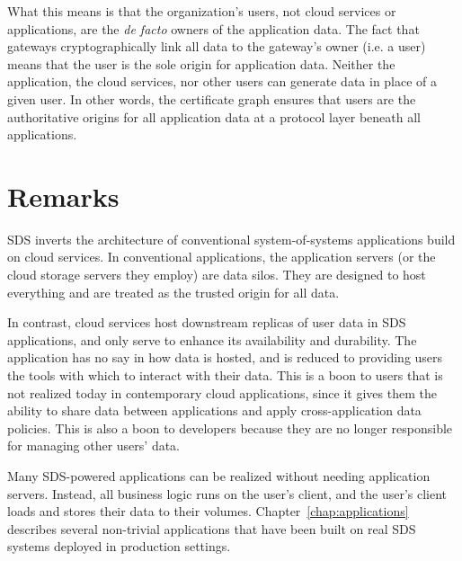 What this means is that the organization's users, not cloud services or
applications, are the \emph{de facto} owners of the application data.  The fact that
gateways cryptographically link all data to the gateway's owner (i.e. a user) 
means that the user is the sole origin for
application data.  Neither the application, the cloud services, nor other users
can generate data in place of a given user.  In other words, the certificate
graph ensures that users are the authoritative origins for all application data
at a protocol layer beneath all applications.

\section{Remarks}

SDS inverts the architecture of conventional system-of-systems applications
build on cloud services.  In conventional
applications, the application servers (or the cloud storage servers they employ)
are data silos.  They are designed to
host everything and are treated as the trusted origin for all data.

In contrast, cloud services host downstream replicas of user
data in SDS applications, and only serve to enhance its availability and durability.  The application has
no say in how data is hosted, and is reduced to providing users the tools with
which to interact with their data.  This is a boon to users that is not realized
today in contemporary cloud applications,
since it gives them the ability to share data between applications and apply
cross-application data policies.  This is also a boon to developers because they
are no longer responsible for managing other users' data.

Many SDS-powered applications can be realized without needing application
servers.  Instead, all business logic runs on the user's client, and the user's
client loads and stores their data to their volumes.
Chapter~\ref{chap:applications} describes several non-trivial applications that
have been built on real SDS systems deployed in production settings.
